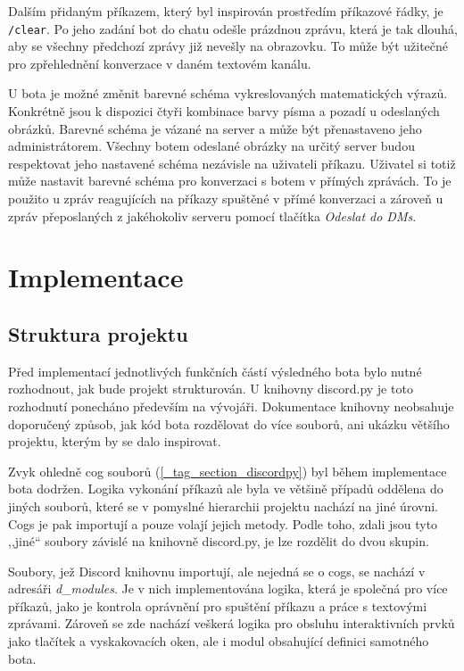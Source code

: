 \documentclass[FM]{tulthesis}
\begin{document}
	Dalším přidaným příkazem, který byl inspirován prostředím příkazové řádky, je \verb|/clear|. Po jeho zadání bot do chatu odešle  prázdnou zprávu, která je tak dlouhá, aby se všechny předchozí zprávy již nevešly na obrazovku. To může být užitečné pro zpřehlednění konverzace v daném textovém kanálu.
	
	U bota je možné změnit barevné schéma vykreslovaných matematických výrazů. Konkrétně jsou k dispozici čtyři kombinace barvy písma a pozadí u odeslaných obrázků. Barevné schéma je vázané na server a může být přenastaveno jeho administrátorem. Všechny botem odeslané obrázky na určitý server budou respektovat jeho nastavené schéma nezávisle na uživateli příkazu. Uživatel si totiž může nastavit barevné schéma pro konverzaci s botem v přímých zprávách. To je použito u zpráv reagujících na příkazy spuštěné v přímé konverzaci a zároveň u zpráv přeposlaných z jakéhokoliv serveru pomocí tlačítka \textit{Odeslat do DMs}.
	
	\section{Implementace}
	
	\subsection{Struktura projektu}

	Před implementací jednotlivých funkčních částí výsledného bota bylo nutné rozhodnout, jak bude projekt strukturován. U knihovny discord.py je toto rozhodnutí ponecháno především na vývojáři. Dokumentace knihovny neobsahuje doporučený způsob, jak kód bota rozdělovat do více souborů, ani ukázku většího projektu, kterým by se dalo inspirovat.
	
	Zvyk ohledně cog souborů (\ref{_tag_section_discordpy}) byl během implementace bota dodržen. Logika vykonání příkazů ale byla ve většině případů oddělena do jiných souborů, které se v pomyslné hierarchii projektu nachází na jiné úrovni. Cogs je pak importují a pouze volají jejich metody. Podle toho, zdali jsou tyto ,,jiné`` soubory závislé na knihovně discord.py, je lze rozdělit do dvou skupin.
	
	Soubory, jež Discord knihovnu importují, ale nejedná se o cogs, se nachází v adresáři \textit{d\_modules}. Je v nich implementována logika, která je společná pro více příkazů, jako je kontrola oprávnění pro spuštění příkazu a práce s textovými zprávami. Zároveň se zde nachází veškerá logika pro obsluhu interaktivních prvků jako tlačítek a vyskakovacích oken, ale i modul obsahující definici samotného bota.
	
\end{document}
